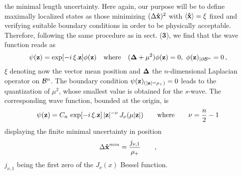 \documentclass[a4paper,10pt]{article}
\newcommand{\x}{\mbox{\rm{\bf \^ x}}}
\newcommand{\cB}{{\cal B}}
\begin{document}
the minimal length uncertainty. Here again, our purpose will be to
define maximally localized states as those minimizing $(\Delta
\x)^2$ with $\langle \x \rangle = {\xi}$ fixed and verifying
suitable boundary conditions in order to be physically acceptable.
Therefore, following the same procedure as in sect. ({\bf 3}), we
find that the wave function reads as
\begin{equation}
\psi ({\bf z}) = \exp[-i \, {\xi}.{\bf z}] \phi ({\bf z}) \quad
\mbox{where} \quad ({\bf \Delta} + \mu ^2)\phi ({\bf z}) = 0, \,\,
\phi ({\bf z})_{\vert \partial \cB^n} =0 \, ,
\end{equation}
$\xi$ denoting now the vector mean position and ${\bf \Delta}$ the
$n$-dimensional Laplacian operator on $\cB^n$. The boundary
condition $\psi ({\bf z})_{(|{\bf z}|=\rho_+)} = 0$ leads to the
quantization of $\mu ^2$, whose smallest value is obtained for the
$s$-wave. The corresponding wave function, bounded at the origin,
is
\begin{equation}
\psi ({\bf z}) = C_n \,\exp[-i\,\xi. {\bf z}] \,\vert{\bf
z}\vert^{-\nu}\, J_{\nu} (\mu |{\bf z}|)\qquad {\rm where}\qquad
\nu=\frac n2 - 1
\end{equation}
displaying the finite minimal uncertainty in position
\begin{equation}
\Delta \x^{min} = \frac{j_{\nu,1}}{\rho_+} \qquad, \label{xmin}
\end{equation}
$j_{\nu,1}$ being the first zero of the $J_{\nu} (x)$ Bessel
function.
\end{document}
